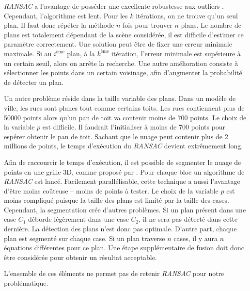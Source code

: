 ﻿\documentclass[12pt, twoside]{article}
\begin{document}
\textit{RANSAC} a l’avantage de posséder une excellente robustesse aux outliers \cite{RANSAC1}. Cependant, l’algorithme est lent. Pour les $k$ itérations, on ne trouve qu’un seul plan. Il faut donc répéter la méthode $n$ fois pour trouver $n$ plans. Le nombre de plans est totalement dépendant de la scène considérée, il est difficile d’estimer ce paramètre correctement. Une solution peut être de fixer une erreur minimale maximale. Si au $i^\text{ème}$ plan, à la $k^\text{ème}$ itération, l’erreur minimale est supérieure à un certain seuil, alors on arrête la recherche. Une autre amélioration consiste à sélectionner les points dans un certain voisinage, afin d’augmenter la probabilité de détecter un plan.

Un autre problème réside dans la taille variable des plans. Dans un modèle de ville, les rues sont planes tout comme certains toits. Les rues contiennent plus de 50000 points alors qu'un pan de toit va contenir moins de 700 points. Le choix de la variable $p$ est difficile. Il faudrait l'initialiser à moins de 700 points pour espérer obtenir le pan de toit. Sachant que le nuage peut contenir plus de 2 millions de points, le temps d'exécution du \textit{RANSAC} devient extrêmement long.

Afin de raccourcir le temps d'exécution, il est possible de segmenter le nuage de points en une grille 3D, comme proposé par \cite{RANSAC2}. Pour chaque bloc un algorithme de \textit{RANSAC} est lancé. Facilement parallélisable, cette technique a aussi l'avantage d'être moins coûteuse -- moins de points à tester. Le choix de la variable $p$ est moins compliqué puisque la taille des plans est limité par la taille des cases. Cependant, la segmentation crée d'autres problèmes. Si un plan présent dans une case $C_1$ déborde légèrement dans une case $C_2$, il ne sera pas détecté dans cette dernière. La détection des plans n'est donc pas optimale. D'autre part, chaque plan est segmenté sur chaque case. Si un plan traverse $n$ cases, il y aura $n$ équations différentes pour ce plan. Une étape supplémentaire de fusion doit donc être considérée pour obtenir un résultat acceptable.

L'ensemble de ces éléments ne permet pas de retenir \textit{RANSAC} pour notre problématique.
\end{document}
